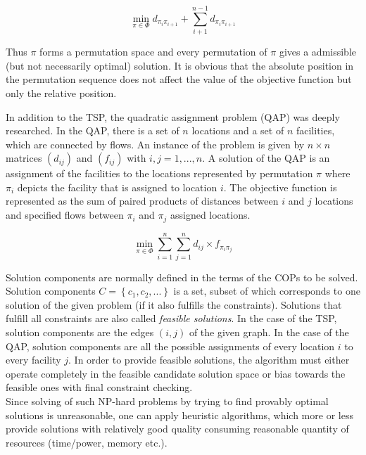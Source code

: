\begin{equation}
\min \limits_{\pi \in \Phi} {d_{\pi_i \pi_{i+1}}} + \sum \limits_{i+1}^{n-1} {d_{\pi_i \pi_{i+1}}}
\end{equation}

Thus $\pi$ forms a permutation space and every permutation of $\pi$ gives a admissible (but not necessarily optimal) solution. It is obvious that the absolute position in the permutation sequence does not affect the value of the objective function but only the relative position.

In addition to the TSP, the quadratic assignment problem (QAP) was deeply researched. In the QAP, there is a set of $n$ locations and a set of $n$ facilities, which are connected by flows. An instance of the problem is given by $n \times n$ matrices $(d_{ij})$ and $(f_{ij})$ with $i, j = 1,...,n$. A solution of the QAP is an assignment of the facilities to the locations represented by permutation $\pi$ where $\pi_i$ depicts the facility that is assigned to location $i$. The objective function is represented as the sum of paired products of distances between $i$ and $j$ locations and specified flows between $\pi_i$ and $\pi_j$ assigned locations.

\begin{equation}
\min \limits_{\pi \in \Phi} \sum \limits_{i=1}^n \sum \limits_{j=1}^n {d_{ij} \times f_{\pi_i \pi_j}}
\end{equation}

Solution components are normally defined in the terms of the COPs to be solved. Solution components $C=\left\{c_1,c_2,...\right\}$ is a set, subset of which corresponds to one solution of the given problem (if it also fulfills the constraints). Solutions that fulfill all constraints are also called \emph{feasible solutions}. In the case of the TSP, solution components are the edges $(i,j)$ of the given graph. In the case of the QAP, solution components are all the possible assignments of every location $i$ to every facility $j$. In order to provide feasible solutions, the algorithm must either operate completely in the feasible candidate solution space or bias towards the feasible ones with final constraint checking. \\

Since solving of such NP-hard problems by trying to find provably optimal solutions is unreasonable, one can apply heuristic algorithms, which more or less provide solutions with relatively good quality consuming reasonable quantity of resources (time/power, memory etc.). \\

